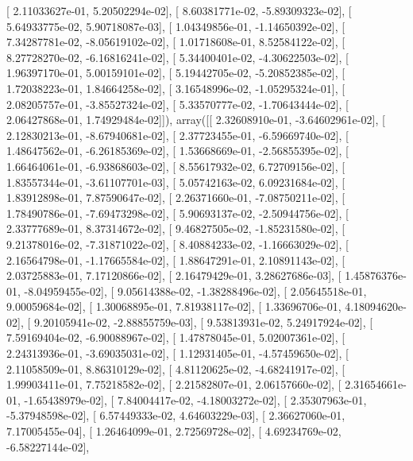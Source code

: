 \documentclass{article}
\begin{document}
       [  2.11033627e-01,   5.20502294e-02],
       [  8.60381771e-02,  -5.89309323e-02],
       [  5.64933775e-02,   5.90718087e-03],
       [  1.04349856e-01,  -1.14650392e-02],
       [  7.34287781e-02,  -8.05619102e-02],
       [  1.01718608e-01,   8.52584122e-02],
       [  8.27728270e-02,  -6.16816241e-02],
       [  5.34400401e-02,  -4.30622503e-02],
       [  1.96397170e-01,   5.00159101e-02],
       [  5.19442705e-02,  -5.20852385e-02],
       [  1.72038223e-01,   1.84664258e-02],
       [  3.16548996e-02,  -1.05295324e-01],
       [  2.08205757e-01,  -3.85527324e-02],
       [  5.33570777e-02,  -1.70643444e-02],
       [  2.06427868e-01,   1.74929484e-02]]), array([[  2.32608910e-01,  -3.64602961e-02],
       [  2.12830213e-01,  -8.67940681e-02],
       [  2.37723455e-01,  -6.59669740e-02],
       [  1.48647562e-01,  -6.26185369e-02],
       [  1.53668669e-01,  -2.56855395e-02],
       [  1.66464061e-01,  -6.93868603e-02],
       [  8.55617932e-02,   6.72709156e-02],
       [  1.83557344e-01,  -3.61107701e-03],
       [  5.05742163e-02,   6.09231684e-02],
       [  1.83912898e-01,   7.87590647e-02],
       [  2.26371660e-01,  -7.08750211e-02],
       [  1.78490786e-01,  -7.69473298e-02],
       [  5.90693137e-02,  -2.50944756e-02],
       [  2.33777689e-01,   8.37314672e-02],
       [  9.46827505e-02,  -1.85231580e-02],
       [  9.21378016e-02,  -7.31871022e-02],
       [  8.40884233e-02,  -1.16663029e-02],
       [  2.16564798e-01,  -1.17665584e-02],
       [  1.88647291e-01,   2.10891143e-02],
       [  2.03725883e-01,   7.17120866e-02],
       [  2.16479429e-01,   3.28627686e-03],
       [  1.45876376e-01,  -8.04959455e-02],
       [  9.05614388e-02,  -1.38288496e-02],
       [  2.05645518e-01,   9.00059684e-02],
       [  1.30068895e-01,   7.81938117e-02],
       [  1.33696706e-01,   4.18094620e-02],
       [  9.20105941e-02,  -2.88855759e-03],
       [  9.53813931e-02,   5.24917924e-02],
       [  7.59169404e-02,  -6.90088967e-02],
       [  1.47878045e-01,   5.02007361e-02],
       [  2.24313936e-01,  -3.69035031e-02],
       [  1.12931405e-01,  -4.57459650e-02],
       [  2.11058509e-01,   8.86310129e-02],
       [  4.81120625e-02,  -4.68241917e-02],
       [  1.99903411e-01,   7.75218582e-02],
       [  2.21582807e-01,   2.06157660e-02],
       [  2.31654661e-01,  -1.65438979e-02],
       [  7.84004417e-02,  -4.18003272e-02],
       [  2.35307963e-01,  -5.37948598e-02],
       [  6.57449333e-02,   4.64603229e-03],
       [  2.36627060e-01,   7.17005455e-04],
       [  1.26464099e-01,   2.72569728e-02],
       [  4.69234769e-02,  -6.58227144e-02],
\end{document}
